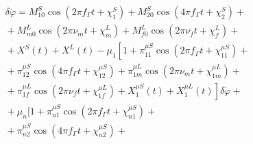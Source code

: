 \begin{multicols}{2}
\noindent
\begin{multline*}
\!\!\!\!\delta \ddot\varphi = M_{10}^S \cos \left(2\pi f_\Gamma t +\chi_1^S\right) +  M_{20}^S \cos \left(4\pi f_\Gamma t +\chi_2^S\right)+{}\\
{}+M_{m0}^L \cos \left(2\pi \nu_m t +\chi_m^L\right)+ M_{f0}^L \cos \left(2\pi \nu_f t +\chi_f^L\right) +{} \\
 {}+X^S (t) + X^L (t)- \mu_1\left[ 1+ \pi^{\mu S}_{11}\cos \left(2\pi f_\Gamma t +\chi_{11}^{\mu S}\right)+{}\right.\\
 {}+\pi^{\mu S}_{12} \cos \left(4\pi f_\Gamma t +\chi_{12}^{\mu S}\right) + \pi^{\mu L}_{1m} \cos \left(2\pi \nu_m t +\chi_{1m}^{\mu L}\right)+{}\\
\left. {}+\pi^{\mu L}_{1f} \cos \left(2\pi \nu_f t +\chi_{1f}^{\mu L}\right)+ X^{\mu S}_1 (t) + X_1^{\mu L}(t)\right] \delta \dot\varphi+{}\\
{} +\mu_n \biggl[ 1 + \pi_{n1}^{\mu S}\cos \left( 2\pi f_\Gamma t + \chi_{n1}^{\mu S}\right)+{}\\
{}+ \pi_{n2}^{\mu S} \cos \left( 4 \pi f_\Gamma t + \chi_{n2}^{\mu S}\right) +{}
\end{multline*}


\end{multicols}
